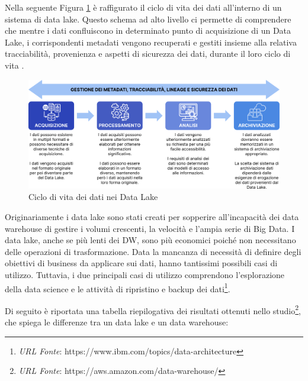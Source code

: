 Nella seguente Figura \ref{fig:Data Lake Life Cycle} è raffigurato il ciclo di vita dei dati all'interno di un sistema di data lake. Questo schema ad alto livello ci permette di comprendere che mentre i dati confluiscono in determinato punto di acquisizione di un Data Lake, i corrispondenti metadati vengono recuperati e gestiti insieme alla relativa tracciabilità, provenienza e aspetti di sicurezza dei dati, durante il loro ciclo di vita \cite{data_lake_for_enterprices}.

\begin{figure}[H]
    \centering
    \includegraphics[width=1\linewidth]{figure/capitolo_2/Data Lake Life Cycle.pdf}
    \caption{Ciclo di vita dei dati nei Data Lake}
    \label{fig:Data Lake Life Cycle}
\end{figure}

Originariamente i data lake sono stati creati per sopperire all'incapacità dei data warehouse di gestire i volumi crescenti, la velocità e l'ampia serie di Big Data. I data lake, anche se più lenti dei DW, sono più economici poiché non necessitano delle operazioni di trasformazione. Data la mancanza di necessità di definire degli obiettivi di business da applicare sui dati, hanno tantissimi possibili casi di utilizzo. Tuttavia, i due principali casi di utilizzo comprendono l'esplorazione della data science e le attività di ripristino e backup dei dati\footnote{\textit{URL Fonte}: https://www.ibm.com/topics/data-architecture}.

Di seguito è riportata una tabella riepilogativa dei risultati ottenuti nello studio\footnote{\textit{URL Fonte}: https://aws.amazon.com/data-warehouse/}, che spiega le differenze tra un data lake e un data warehouse:

